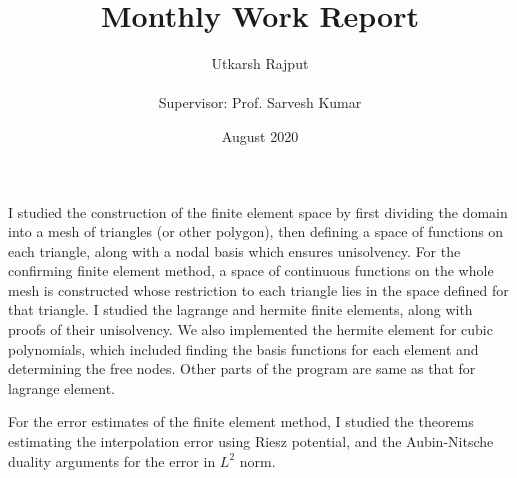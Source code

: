 \documentclass[12pt]{article}
\title{Monthly Work Report}
\date{August 2020}
\author{Utkarsh Rajput \\\\{Supervisor: Prof. Sarvesh Kumar}}
\begin{document}
	\maketitle
	I studied the construction of the finite element space by first dividing the domain into a mesh of triangles (or other polygon), then defining a space of functions on each triangle, along with a nodal basis which ensures unisolvency. For the confirming finite element method, a space of continuous functions on the whole mesh is constructed whose restriction to each triangle lies in the space defined for that triangle. I studied the lagrange and hermite finite elements, along with proofs of their unisolvency. We also implemented the hermite element for cubic polynomials, which included finding the basis functions for each element and determining the free nodes. Other parts of the program are same as that for lagrange element.
	
	For the error estimates of the finite element method, I studied the theorems estimating the interpolation error using Riesz potential, and the Aubin-Nitsche duality arguments for the error in $L^2$ norm.
\end{document}
